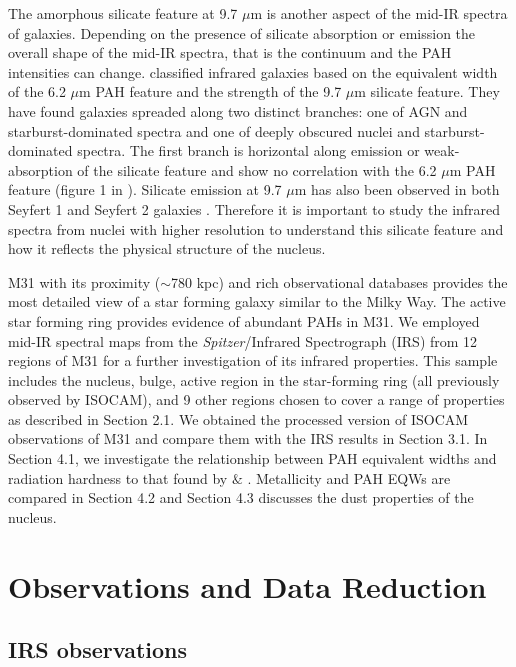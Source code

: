 \documentclass[useAMS,usenatbib,a4paper]{mn2e}
\begin{document}
The amorphous silicate feature at 9.7 $\mu$m is another aspect of the mid-IR spectra of galaxies. Depending on the presence of silicate absorption or emission the overall shape of the mid-IR spectra, that is the continuum and the PAH intensities can change. \citet{Spoon2007} classified infrared galaxies based on the equivalent width of the 6.2 $\mu$m PAH feature and the strength of the 9.7 $\mu$m silicate feature. They have found galaxies spreaded along two distinct branches: one of AGN and starburst-dominated spectra and one of deeply obscured nuclei and starburst-dominated spectra. The first branch is horizontal along emission or weak-absorption of the silicate feature and show no correlation with the 6.2 $\mu$m PAH feature (figure 1 in \citet{Spoon2007}). Silicate emission at 9.7 $\mu$m has also been observed in both Seyfert 1 and Seyfert 2 galaxies \citep{Mason2009}. Therefore it is important to study the infrared spectra from nuclei with higher resolution to understand this silicate feature and how it reflects the physical structure of the nucleus. 

M31 with its proximity ($\sim$780 kpc) and rich observational databases provides the most detailed view of a star forming galaxy similar to the Milky Way. The active star forming ring \citep{Barmby2006lr} provides evidence of abundant PAHs in M31. We employed mid-IR spectral maps from the {\em Spitzer}/Infrared Spectrograph (IRS) from 12 regions of M31 for a further investigation of its infrared properties. This sample includes the nucleus, bulge, active region in the star-forming ring (all previously observed by ISOCAM), and 9 other regions chosen to cover a range of properties as described in Section 2.1. We obtained the processed version of ISOCAM observations of M31 and compare them with the IRS results in Section  3.1. In Section 4.1, we investigate the relationship between PAH equivalent widths and radiation hardness to that found by \citet{Engelbracht_2008} $\&$ \citet{Gordon:2008lr}. Metallicity and PAH EQWs are compared in Section 4.2 and Section 4.3 discusses the dust properties of the nucleus. 	

\section[]{Observations and Data Reduction}

\subsection{IRS observations}
\end{document}
